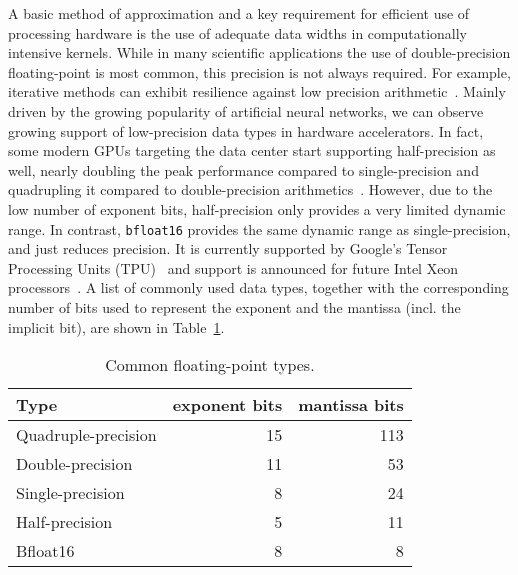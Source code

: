 
A basic method of approximation and a key requirement for efficient use of processing hardware is the use of adequate data widths in computationally intensive kernels. While in many scientific applications the use of double-precision floating-point is most common, this precision is not always required. For example, iterative methods can exhibit resilience against low precision arithmetic~\cite{lass17-esl, LassAC}. Mainly driven by the growing popularity of artificial neural networks, we can observe growing support of low-precision data types %
in hardware accelerators. In fact, some modern GPUs targeting the data center start supporting half-precision as well, nearly doubling the peak performance compared to single-precision and quadrupling it compared to double-precision arithmetics~\cite{tesla}. However, due to the low number of exponent bits, half-precision only provides a very limited dynamic range. In contrast, \texttt{bfloat16} provides the same dynamic range as single-precision, and just reduces precision. It is currently supported by Google's Tensor Processing Units (TPU)~\cite{tpu} and support is announced for future Intel Xeon processors~\cite{xeon}. A list of commonly used data types, together with the corresponding number of bits used to represent the exponent and the mantissa (incl. the implicit bit), are shown in Table~\ref{tab:float}. 
\begin{table}
  \caption{Common floating-point types.}
  \label{tab:float}
  \begin{tabular}{lrr}
    Type & exponent bits & mantissa bits \\
    \hline
    Quadruple-precision & 15 & 113 \\
    Double-precision & 11 & 53 \\
    Single-precision & 8 & 24 \\
    Half-precision & 5 & 11 \\
    Bfloat16 & 8 & 8
  \end{tabular}
\end{table}


